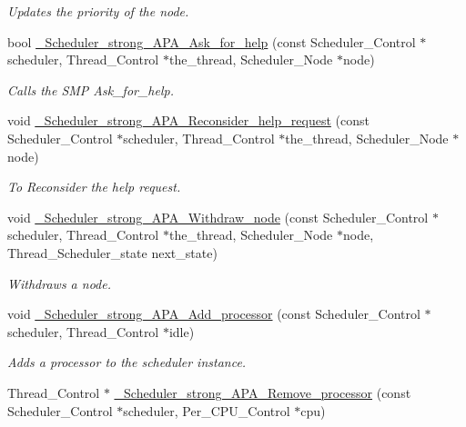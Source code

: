 \begin{DoxyCompactItemize}
\begin{DoxyCompactList}\small\item\em Updates the priority of the node. \end{DoxyCompactList}\item 
bool \hyperlink{group__RTEMSScoreSchedulerStrongAPA_gad863eddc3fa4e2d785fb64af6505e90b}{\+\_\+\+Scheduler\+\_\+strong\+\_\+\+A\+P\+A\+\_\+\+Ask\+\_\+for\+\_\+help} (const Scheduler\+\_\+\+Control $\ast$scheduler, Thread\+\_\+\+Control $\ast$the\+\_\+thread, Scheduler\+\_\+\+Node $\ast$node)
\begin{DoxyCompactList}\small\item\em Calls the S\+MP Ask\+\_\+for\+\_\+help. \end{DoxyCompactList}\item 
void \hyperlink{group__RTEMSScoreSchedulerStrongAPA_ga7809e64065ec5d291f3dc82220a68d3f}{\+\_\+\+Scheduler\+\_\+strong\+\_\+\+A\+P\+A\+\_\+\+Reconsider\+\_\+help\+\_\+request} (const Scheduler\+\_\+\+Control $\ast$scheduler, Thread\+\_\+\+Control $\ast$the\+\_\+thread, Scheduler\+\_\+\+Node $\ast$node)
\begin{DoxyCompactList}\small\item\em To Reconsider the help request. \end{DoxyCompactList}\item 
void \hyperlink{group__RTEMSScoreSchedulerStrongAPA_gaf43eb65a6fbbe2826ca4cec68a930cb5}{\+\_\+\+Scheduler\+\_\+strong\+\_\+\+A\+P\+A\+\_\+\+Withdraw\+\_\+node} (const Scheduler\+\_\+\+Control $\ast$scheduler, Thread\+\_\+\+Control $\ast$the\+\_\+thread, Scheduler\+\_\+\+Node $\ast$node, Thread\+\_\+\+Scheduler\+\_\+state next\+\_\+state)
\begin{DoxyCompactList}\small\item\em Withdraws a node. \end{DoxyCompactList}\item 
void \hyperlink{group__RTEMSScoreSchedulerStrongAPA_ga6ac09dac24785561fd7c5ee5bbd8f5ca}{\+\_\+\+Scheduler\+\_\+strong\+\_\+\+A\+P\+A\+\_\+\+Add\+\_\+processor} (const Scheduler\+\_\+\+Control $\ast$scheduler, Thread\+\_\+\+Control $\ast$idle)
\begin{DoxyCompactList}\small\item\em Adds a processor to the scheduler instance. \end{DoxyCompactList}\item 
Thread\+\_\+\+Control $\ast$ \hyperlink{group__RTEMSScoreSchedulerStrongAPA_ga91dc29dcdeea35e3329623be7a798e39}{\+\_\+\+Scheduler\+\_\+strong\+\_\+\+A\+P\+A\+\_\+\+Remove\+\_\+processor} (const Scheduler\+\_\+\+Control $\ast$scheduler, Per\+\_\+\+C\+P\+U\+\_\+\+Control $\ast$cpu)

\end{DoxyCompactItemize}
